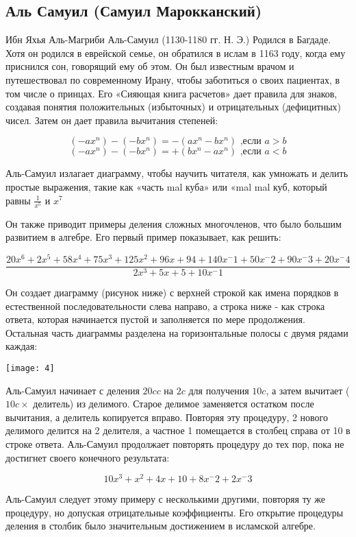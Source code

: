 \subsection{Аль Самуил (Самуил Марокканский)}
Ибн Яхья Аль-Магриби Аль-Самуил (1130-1180 гг. Н. Э.) Родился в Багдаде. Хотя он родился в еврейской семье, он обратился в ислам в 1163 году, когда ему приснился сон, говорящий ему об этом. Он был известным врачом и путешествовал по современному Ирану, чтобы заботиться о своих пациентах, в том числе о принцах. Его «Сияющая книга расчетов» дает правила для знаков, создавая понятия положительных (избыточных) и отрицательных (дефицитных) чисел. Затем он дает правила вычитания степеней:

$$(-ax^n) - (-bx^n) = -(ax^n - bx^n) \textrm{ ,если } a > b$$
$$(-ax^n) - (-bx^n) = +(bx^n - ax^n) \textrm{ ,если } a < b$$

Аль-Самуил излагает диаграмму, чтобы научить читателя, как умножать и делить
простые выражения, такие как «часть mal куба» или «mal mal куб, который
равны $\frac{1}{x^5}$ и $x^7$

Он также приводит примеры деления сложных многочленов, что было большим развитием в алгебре. Его первый пример показывает, как решить:

$$\frac{20x^6 + 2x^5 +58x^4 + 75x^3 + 125x^2 + 96x + 94 + 140x^-1 + 50x^-2 + 90x^-3 + 20x^-4}{2x^3 + 5x + 5 + 10x^-1}$$

Он создает диаграмму (рисунок ниже) с верхней строкой как имена порядков в естественной последовательности слева направо, а строка ниже - как строка ответа, которая начинается пустой и заполняется по мере продолжения. Остальная часть диаграммы разделена на горизонтальные полосы с двумя рядами каждая:

\texttt{[image: 4]}

Аль-Самуил начинает с деления $20cc$ на $2c$ для получения $10c$, а затем вычитает ($10c \times$ делитель) из делимого. Старое делимое заменяется остатком после вычитания, а делитель копируется вправо. Повторяя эту процедуру, 2 нового делимого делится на 2 делителя, а частное 1 помещается в столбец справа от 10 в строке ответа. Аль-Самуил продолжает повторять процедуру до тех пор, пока не достигнет своего конечного результата:

$$10x^3 + x^2 + 4x + 10 + 8x^-2 +2x^-3$$

Аль-Самуил следует этому примеру с несколькими другими, повторяя ту же процедуру, но допуская отрицательные коэффициенты. Его открытие процедуры деления в столбик было значительным достижением в исламской алгебре.


